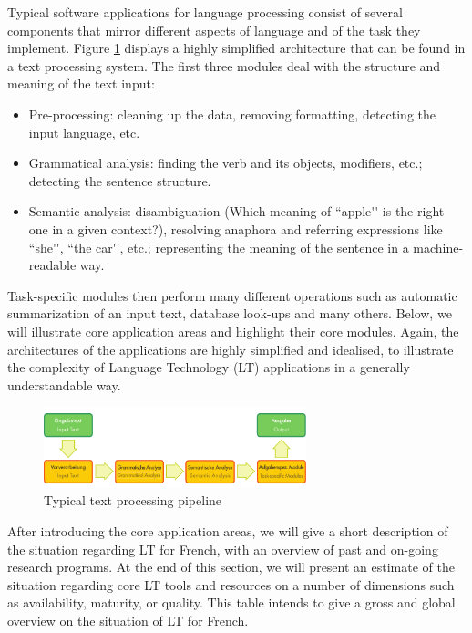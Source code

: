 \begin{multicols}{2}
Typical software applications for language processing consist of
several components that mirror different aspects of language and of
the task they implement. Figure \ref{fig:textprocarchiEng} displays a highly
simplified architecture that can be found in a text processing
system. The first three modules deal with the structure and meaning of
the text input:
\begin{itemize}
\item Pre-processing: cleaning up the data, removing formatting,
  detecting the input language, etc.
\item Grammatical analysis: finding the verb and its objects,
  modifiers, etc.; detecting the sentence structure.
\item Semantic analysis: disambiguation (Which meaning of ``apple{\mbox '}{\mbox '} is the
  right one in a given context?), resolving anaphora and referring
  expressions like ``she{\mbox '}{\mbox '}, ``the car{\mbox '}{\mbox '}, etc.; representing the meaning of the
  sentence in a machine-readable way.
\end{itemize}

Task-specific modules then perform many different operations such as
automatic summarization of an input text, database look-ups and many
others. Below, we will illustrate core application areas and highlight
their core modules. Again, the architectures of the applications are
highly simplified and idealised, to illustrate the complexity of
Language Technology (LT) applications in a generally understandable
way.

\begin{figure}
\begin{center}
 \includegraphics[width=3.0in]{../_media/text_processing_app_architecture}
\caption{Typical text processing pipeline}
\label{fig:textprocarchiEng}
\end{center}
\end{figure}

After introducing the core application areas, we will give a short
description of the situation regarding LT for French, with an overview
of past and on-going research programs. At the end of this section, we
will present an estimate of the situation regarding core LT tools and
resources on a number of dimensions such as availability, maturity, or
quality. This table intends to give a gross and global overview on the
situation of LT for French.


\end{multicols}
